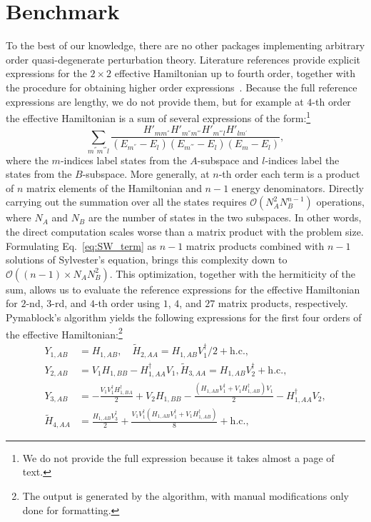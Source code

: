 \section{Benchmark}
\label{sec:benchmark}

To the best of our knowledge, there are no other packages implementing arbitrary order quasi-degenerate perturbation theory.
Literature references provide explicit expressions for the $2 \times 2$ effective Hamiltonian up to fourth order, together with the procedure for obtaining higher order expressions~\cite{Winkler_2003}.
Because the full reference expressions are lengthy, we do not provide them, but for example at $4$-th order the effective Hamiltonian is a sum of several expressions of the form:\footnote{We do not provide the full expression because it takes almost a page of text.}
\begin{equation}
\label{eq:SW_term}
\sum_{m^{''} m^{'''} l}
\frac{H'_{mm^{''}}H'_{m^{''}m^{'''}}H'_{m^{'''}l}H'_{lm^{'}}}{(E_{m^{''}}-E_{l})(E_{m^{'''}}-E_{l})(E_{m}-E_{l})},
\end{equation}
where the $m$-indices label states from the $A$-subspace and $l$-indices label the states from the $B$-subspace.
More generally, at $n$-th order each term is a product of $n$ matrix elements of the Hamiltonian and $n-1$ energy denominators.
Directly carrying out the summation over all the states requires $\mathcal{O}(N_A^2 N_B^{n-1})$ operations, where $N_A$ and $N_B$ are the number of states in the two subspaces.
In other words, the direct computation scales worse than a matrix product with the problem size.
Formulating Eq.~\eqref{eq:SW_term} as $n-1$ matrix products combined with $n-1$ solutions
of Sylvester's equation, brings this complexity down to $\mathcal{O}((n-1) \times N_A N_B^2)$.
This optimization, together with the hermiticity of the sum, allows us to evaluate the reference expressions for the effective Hamiltonian for $2$-nd, $3$-rd, and $4$-th order using $1$, $4$, and $27$ matrix products, respectively.
Pymablock's algorithm yields the following expressions for the first four orders of the effective Hamiltonian:\footnote{The output is generated by the algorithm, with manual modifications only done for formatting.}
\begin{equation}
\begin{split}
    Y_{1,AB} &= H_{1,AB},\quad \tilde{H}_{2,AA} = H_{1,AB} V_{1}^\dagger/2 +\textrm{h.c.},\\
    Y_{2,AB} &= V_{1} H_{1,BB} - H_{1,AA}^\dagger V_{1},\tilde{H}_{3,AA} = H_{1,AB} V_{2}^\dagger +\textrm{h.c.},\\
    Y_{3,AB} &= - \frac{V_{1} V_{1}^\dagger H_{1,BA}^\dagger}{2} + V_{2} H_{1,BB} - \frac{\left(H_{1,AB} V_{1}^\dagger + V_{1} H_{1,AB}^\dagger\right) V_{1}}{2} - H_{1,AA}^\dagger V_{2},\\
    \tilde{H}_{4,AA} &= \frac{H_{1,AB} V_{3}^\dagger}{2} + \frac{V_{1} V_{1}^\dagger \left(H_{1,AB} V_{1}^\dagger + V_{1} H_{1,AB}^\dagger\right)}{8}+\textrm{h.c.},
\end{split}
\end{equation}
